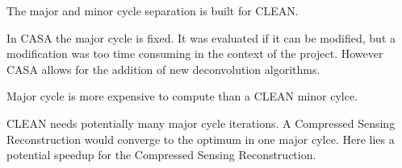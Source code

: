 The major and minor cycle separation is built for CLEAN.

In CASA the major cycle is fixed. It was evaluated if it can be modified, but a modification was too time consuming in the context of the project. However CASA allows for the addition of new deconvolution algorithms. 


Major cycle is more expensive to compute than a CLEAN minor cylce. 

CLEAN needs potentially many major cycle iterations. A Compressed Sensing Reconstruction would converge to the optimum in one major cylce. Here lies a potential speedup for the Compressed Sensing Reconstruction.







 
